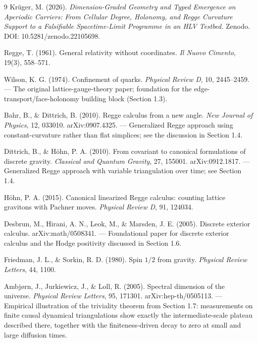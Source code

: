 \begin{thebibliography}{9}
Krüger, M. (2026). \emph{Dimension-Graded Geometry and Typed Emergence on
Aperiodic Carriers: From Cellular Degree, Holonomy, and Regge Curvature
Support to a Falsifiable Spacetime-Limit Programme in an HLV Testbed.}
Zenodo. DOI: 10.5281/zenodo.22105698.

Regge, T. (1961). General relativity without coordinates.
\emph{Il Nuovo Cimento}, 19(3), 558--571.

Wilson, K. G. (1974). Confinement of quarks. \emph{Physical Review D}, 10,
2445--2459. — The original lattice-gauge-theory paper; foundation for the
edge-transport/face-holonomy building block (Section 1.3).

Bahr, B., \& Dittrich, B. (2010). Regge calculus from a new angle.
\emph{New Journal of Physics}, 12, 033010. arXiv:0907.4325. — Generalized
Regge approach using constant-curvature rather than flat simplices; see
the discussion in Section 1.4.

Dittrich, B., \& Höhn, P. A. (2010). From covariant to canonical
formulations of discrete gravity. \emph{Classical and Quantum Gravity},
27, 155001. arXiv:0912.1817. — Generalized Regge approach with variable
triangulation over time; see Section 1.4.

Höhn, P. A. (2015). Canonical linearized Regge calculus: counting lattice
gravitons with Pachner moves. \emph{Physical Review D}, 91, 124034.

Desbrun, M., Hirani, A. N., Leok, M., \& Marsden, J. E. (2005). Discrete
exterior calculus. arXiv:math/0508341. — Foundational paper for discrete
exterior calculus and the Hodge positivity discussed in Section 1.6.

Friedman, J. L., \& Sorkin, R. D. (1980). Spin $1/2$ from gravity.
\emph{Physical Review Letters}, 44, 1100.

Ambjørn, J., Jurkiewicz, J., \& Loll, R. (2005). Spectral dimension of the
universe. \emph{Physical Review Letters}, 95, 171301. arXiv:hep-th/0505113.
— Empirical illustration of the triviality theorem from Section 1.7:
measurements on finite causal dynamical triangulations show exactly the
intermediate-scale plateau described there, together with the
finiteness-driven decay to zero at small and large diffusion times.


\end{thebibliography}
